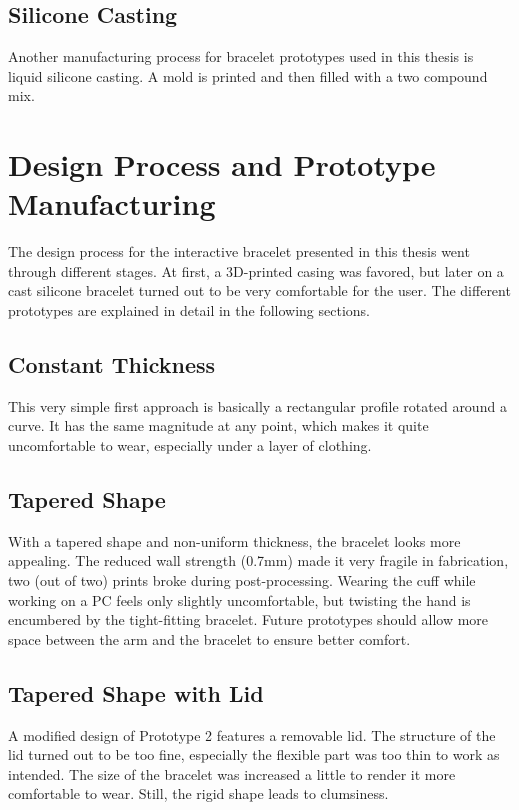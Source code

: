 \subsection{Silicone Casting}
Another manufacturing process for bracelet prototypes used in this thesis is liquid silicone casting. A mold is printed and then filled with a two compound mix.

\section{Design Process and Prototype Manufacturing}

The design process for the interactive bracelet presented in this thesis went through different stages. At first, a 3D-printed casing was favored, but later on a cast silicone bracelet turned out to be very comfortable for the user. The different prototypes are explained in detail in the following sections.

\subsection{Constant Thickness}

This very simple first approach is basically a rectangular profile rotated around a curve. It has the same magnitude at any point, which makes it quite uncomfortable to wear, especially under a layer of clothing.

\subsection{Tapered Shape}

With a tapered shape and non-uniform thickness, the bracelet looks more appealing. The reduced wall strength (0.7mm) made it very fragile in fabrication, two (out of two) prints broke during post-processing. Wearing the cuff while working on a PC feels only slightly uncomfortable, but twisting the hand is encumbered by the tight-fitting bracelet. Future prototypes should allow more space between the arm and the bracelet to ensure better comfort.

\subsection{Tapered Shape with Lid}

A modified design of Prototype 2 features a removable lid. The structure of the lid turned out to be too fine, especially the flexible part was too thin to work as intended. The size of the bracelet was increased a little to render it more comfortable to wear. Still, the rigid shape leads to clumsiness.

